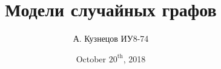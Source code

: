 \title{Модели случайных графов}

\author{А. Кузнецов ИУ8-74}
\date{October $20^{\mathrm{th}}$, 2018}
